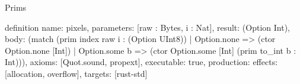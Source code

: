 \begin{lexlean}{Prims}
\begin{semanticmodule}
definition{
  name: pixels,
  parameters: [raw : Bytes, i : Nat],
  result: (Option Int),
  body: (match (prim index raw i : (Option UInt8))
    | Option.none => (ctor Option.none [Int])
    | Option.some b => (ctor Option.some [Int] (prim to_int b : Int))),
  axioms: [Quot.sound, propext],
  executable: true,
  production: {effects: [allocation, overflow], targets: [rust-std]}
}
\end{semanticmodule}
\end{lexlean}
